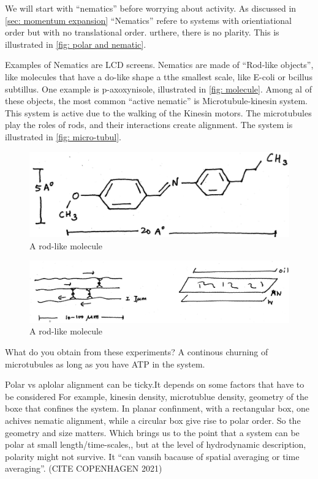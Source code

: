 We will start with ``nematics'' before worrying about activity.
As discussed in \autoref{sec: momentum expansion} ``Nematics'' refere to systems with orientiational order but with no translational order.
urthere, there is no plarity.
This is illustrated in \autoref{fig: polar and nematic}.

Examples of Nematics are LCD screens.
Nematics are made of ``Rod-like objects'', like molecules that have a do-like shape a tthe smallest scale, like E-coli or bcillus subtillus.
One example is p-axoxynisole, illustrated in \autoref{fig: molecule}. 
Among al of these objects, the most common ``active nematic'' is Microtubule-kinesin system.
This system is active due to the walking of the  Kinesin motors.
The microtubules play the roles of rods, and their interactions create alignment.
The system is illustrated in \autoref{fig: micro-tubul}.

\begin{figure}[!htb]
    \centering
    \includegraphics[width=.6\textwidth]{chapters/Figures/nematics/molecule.png}
    \caption{A rod-like molecule}
    \label{fig: molecule}
\end{figure}

\begin{figure}[!htb]
    \centering
    \includegraphics[width=.6\textwidth]{chapters/Figures/nematics/microtubules.png}
    \caption{A rod-like molecule}
    \label{fig: micro-tubul}
\end{figure}

What do you obtain from these experiments?
A continous churning of microtubules as long as you have ATP in the system.

Polar vs aplolar alignment can be ticky.It depends on some factors that have to be considered
For example, kinesin density, microtublue density, geometry of the boxe that confines the system.
In planar confinment, with a rectangular box, one achives nematic alignment, while a circular box give rise to polar order.
So the geometry and size matters.
Which brings us to the point that a system can be polar at small length/time-scales,, but at the level of hydrodynamic description, polarity might not survive.
It ``can vansih bacause of spatial averaging or time averaging''. (CITE COPENHAGEN 2021)

